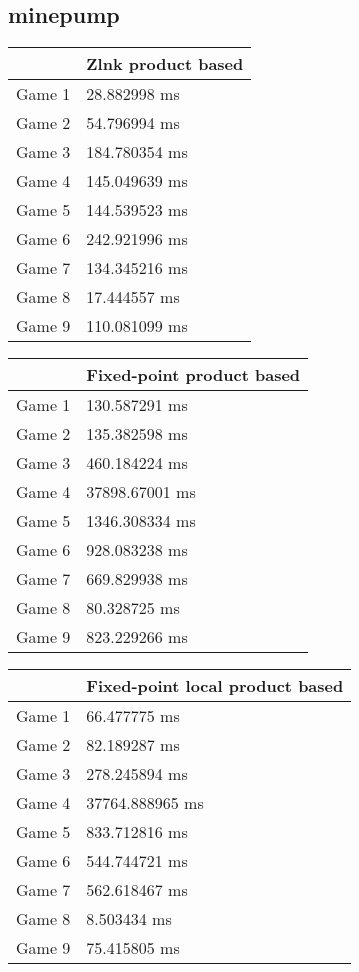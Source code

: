 \subsection{minepump}
\begin{tabular}{|l|l|}
	\hline
	& Zlnk product based \\ \hline
	Game 1 & 28.882998 ms \\ \hline
	Game 2 & 54.796994 ms \\ \hline
	Game 3 & 184.780354 ms \\ \hline
	Game 4 & 145.049639 ms \\ \hline
	Game 5 & 144.539523 ms \\ \hline
	Game 6 & 242.921996 ms \\ \hline
	Game 7 & 134.345216 ms \\ \hline
	Game 8 & 17.444557 ms \\ \hline
	Game 9 & 110.081099 ms \\ \hline
\end{tabular}
\begin{tabular}{|l|l|}
	\hline
	& Fixed-point product based \\ \hline
	Game 1 & 130.587291 ms \\ \hline
	Game 2 & 135.382598 ms \\ \hline
	Game 3 & 460.184224 ms \\ \hline
	Game 4 & 37898.67001 ms \\ \hline
	Game 5 & 1346.308334 ms \\ \hline
	Game 6 & 928.083238 ms \\ \hline
	Game 7 & 669.829938 ms \\ \hline
	Game 8 & 80.328725 ms \\ \hline
	Game 9 & 823.229266 ms \\ \hline
\end{tabular}
\begin{tabular}{|l|l|}
	\hline
	& Fixed-point local product based \\ \hline
	Game 1 & 66.477775 ms \\ \hline
	Game 2 & 82.189287 ms \\ \hline
	Game 3 & 278.245894 ms \\ \hline
	Game 4 & 37764.888965 ms \\ \hline
	Game 5 & 833.712816 ms \\ \hline
	Game 6 & 544.744721 ms \\ \hline
	Game 7 & 562.618467 ms \\ \hline
	Game 8 & 8.503434 ms \\ \hline
	Game 9 & 75.415805 ms \\ \hline
\end{tabular}
